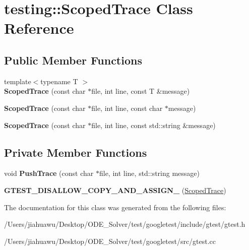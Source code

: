\hypertarget{classtesting_1_1_scoped_trace}{}\section{testing\+:\+:Scoped\+Trace Class Reference}
\label{classtesting_1_1_scoped_trace}
\subsection*{Public Member Functions}
\begin{DoxyCompactItemize}
\item 
\mbox{\label{classtesting_1_1_scoped_trace_a2da90b95d682d518cca472934d53c59c}} 
{\footnotesize template$<$typename T $>$ }\\{\bfseries Scoped\+Trace} (const char $\ast$file, int line, const T \&message)
\item 
\mbox{\label{classtesting_1_1_scoped_trace_accd2a06cc941ffd7d6fe109adfdb4f19}} 
{\bfseries Scoped\+Trace} (const char $\ast$file, int line, const char $\ast$message)
\item 
\mbox{\label{classtesting_1_1_scoped_trace_a1f453a2aade0db6955a111a7cb329615}} 
{\bfseries Scoped\+Trace} (const char $\ast$file, int line, const std\+::string \&message)
\end{DoxyCompactItemize}
\subsection*{Private Member Functions}
\begin{DoxyCompactItemize}
\item 
\mbox{\label{classtesting_1_1_scoped_trace_a905304c342012d6ae1493a1ad3b62255}} 
void {\bfseries Push\+Trace} (const char $\ast$file, int line, std\+::string message)
\item 
\mbox{\label{classtesting_1_1_scoped_trace_aed447fe36b38f99ace904ed52c206eb0}} 
{\bfseries G\+T\+E\+S\+T\+\_\+\+D\+I\+S\+A\+L\+L\+O\+W\+\_\+\+C\+O\+P\+Y\+\_\+\+A\+N\+D\+\_\+\+A\+S\+S\+I\+G\+N\+\_\+} (\mbox{\hyperlink{classtesting_1_1_scoped_trace}{Scoped\+Trace}})
\end{DoxyCompactItemize}


The documentation for this class was generated from the following files\+:\begin{DoxyCompactItemize}
\item 
/\+Users/jiahuawu/\+Desktop/\+O\+D\+E\+\_\+\+Solver/test/googletest/include/gtest/gtest.\+h\item 
/\+Users/jiahuawu/\+Desktop/\+O\+D\+E\+\_\+\+Solver/test/googletest/src/gtest.\+cc\end{DoxyCompactItemize}

